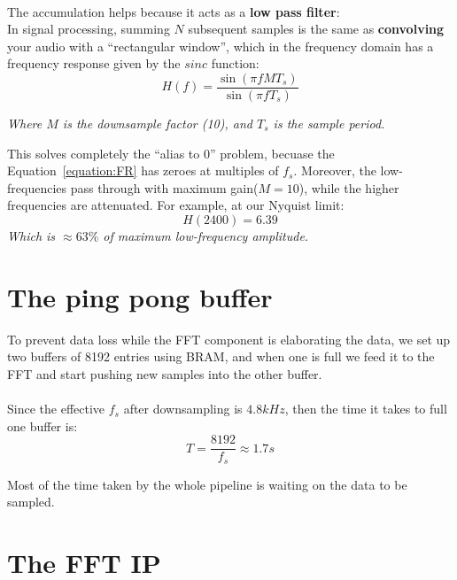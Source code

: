 \paragraph{}
The accumulation helps because it acts as a \textbf{low pass filter}:\\
In signal processing, summing $N$ subsequent samples is the same as \textbf{convolving} your
audio with a ``rectangular window''\cite{dsp}, which in the frequency domain has a frequency response
given by the $sinc$ function:
\begin{equation}
    H(f)=\frac{\sin(\pi f M T_s)}{\sin(\pi f T_s)}
    \label{equation:FR}
\end{equation}  

\textit{Where $M$ is the downsample factor (10), and $T_s$ is the sample period.}

This solves completely the ``alias to 0'' problem, becuase the Equation~\ref{equation:FR} has zeroes at multiples of $f_s$.
Moreover, the low-frequencies pass through with maximum gain($M=10$), while the higher frequencies are attenuated.
For example, at our Nyquist limit:
\begin{equation}
    H(2400) = 6.39
\end{equation}
\textit{Which is $\approx63\%$ of maximum low-frequency amplitude.}

\section{The ping pong buffer}

To prevent data loss while the FFT component is elaborating the data,
we set up two buffers of 8192 entries using BRAM, and when one is full we feed it to the FFT 
and start pushing new samples into the other buffer.
\paragraph{}
Since the effective $f_s$ after downsampling is $4.8kHz$, then the time it takes to full one buffer is:
\begin{equation}
    T = \frac{8192}{f_s} \approx 1.7 s
\end{equation}

Most of the time taken by the whole pipeline is waiting on the data to be sampled.

\section{The FFT IP}\label{section:fft}

